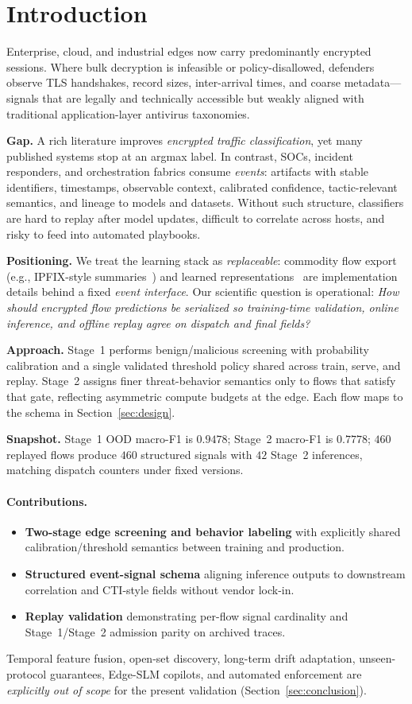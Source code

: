 \section{Introduction}
\label{sec:intro}

Enterprise, cloud, and industrial edges now carry predominantly encrypted sessions.
Where bulk decryption is infeasible or policy-disallowed, defenders observe TLS handshakes, record sizes, inter-arrival times, and coarse metadata---signals that are legally and technically accessible but weakly aligned with traditional application-layer antivirus taxonomies.

\textbf{Gap.}
A rich literature improves \emph{encrypted traffic classification}, yet many published systems stop at an argmax label.
In contrast, SOCs, incident responders, and orchestration fabrics consume \emph{events}: artifacts with stable identifiers, timestamps, observable context, calibrated confidence, tactic-relevant semantics, and lineage to models and datasets.
Without such structure, classifiers are hard to replay after model updates, difficult to correlate across hosts, and risky to feed into automated playbooks.

\textbf{Positioning.}
We treat the learning stack as \emph{replaceable}: commodity flow export (e.g., IPFIX-style summaries~\cite{rfc7011}) and learned representations~\cite{lin2022etbert} are implementation details behind a fixed \emph{event interface}.
Our scientific question is operational: \emph{How should encrypted flow predictions be serialized so training-time validation, online inference, and offline replay agree on dispatch and final fields?}

\textbf{Approach.}
Stage~1 performs benign/malicious screening with probability calibration and a single validated threshold policy shared across train, serve, and replay.
Stage~2 assigns finer threat-behavior semantics only to flows that satisfy that gate, reflecting asymmetric compute budgets at the edge.
Each flow maps to the schema in Section~\ref{sec:design}.

\textbf{Snapshot.}
Stage~1 OOD macro-F1 is $0.9478$; Stage~2 macro-F1 is $0.7778$; $460$ replayed flows produce $460$ structured signals with $42$ Stage~2 inferences, matching dispatch counters under fixed versions.

\paragraph{Contributions.}
\begin{itemize}\itemsep1pt
  \item \textbf{Two-stage edge screening and behavior labeling} with explicitly shared calibration/threshold semantics between training and production.
  \item \textbf{Structured event-signal schema} aligning inference outputs to downstream correlation and CTI-style fields without vendor lock-in.
  \item \textbf{Replay validation} demonstrating per-flow signal cardinality and Stage~1/Stage~2 admission parity on archived traces.
\end{itemize}

Temporal feature fusion, open-set discovery, long-term drift adaptation, unseen-protocol guarantees, Edge-SLM copilots, and automated enforcement are \emph{explicitly out of scope} for the present validation (Section~\ref{sec:conclusion}).
